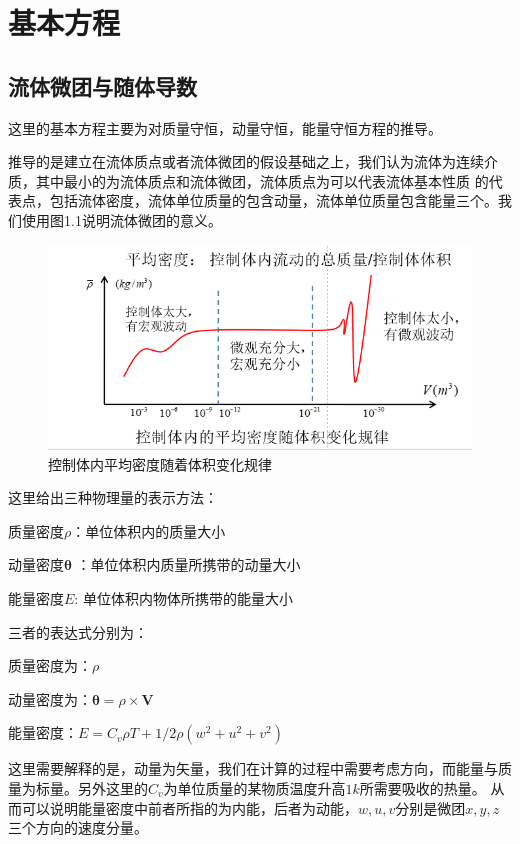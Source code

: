 \documentclass[11pt,twoside]{article}
\begin{document}
\section{基本方程}
\subsection{流体微团与随体导数}
这里的基本方程主要为对质量守恒，动量守恒，能量守恒方程的推导。

推导的是建立在流体质点或者流体微团的假设基础之上，我们认为流体为连续介质，其中最小的为流体质点和流体微团，流体质点为可以代表流体基本性质
的代表点，包括流体密度，流体单位质量的包含动量，流体单位质量包含能量三个。我们使用图1.1说明流体微团的意义。
\begin{figure}[htbp]
    \begin{center}
        \includegraphics{流体质点.jpg}
    \end{center}
    \caption{控制体内平均密度随着体积变化规律}
\end{figure}

这里给出三种物理量的表示方法：

质量密度$\rho$：单位体积内的质量大小

动量密度$\bm{\theta}$ ：单位体积内质量所携带的动量大小

能量密度$E$: 单位体积内物体所携带的能量大小

三者的表达式分别为：

质量密度为：$\rho$

动量密度为：$\bm{\theta} = \rho\times \bm{V}$

能量密度：$E = C_v \rho T + 1/2 \rho (w^2 + u^2 + v^2)$

这里需要解释的是，动量为矢量，我们在计算的过程中需要考虑方向，而能量与质量为标量。另外这里的$C_v$为单位质量的某物质温度升高$1k$所需要吸收的热量。
从而可以说明能量密度中前者所指的为内能，后者为动能，$w,u,v$分别是微团$x,y,z$三个方向的速度分量。
\end{document}
